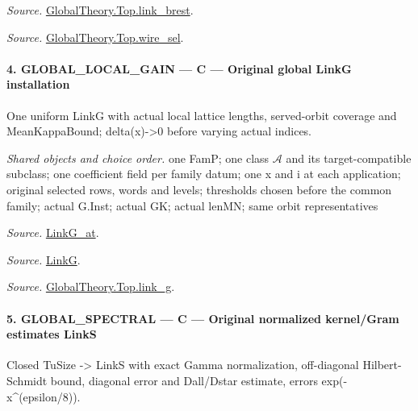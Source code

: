 \documentclass[11pt,a4paper]{article}
\numberwithin{equation}{section}
\theoremstyle{remark}\newtheorem{remark}[theorem]{Remark}
\begin{document}
\emph{Source.} \href{https://github.com/CocoSgt/riemann-hypothesis-lean/blob/7cbf7a0c32fca1badf05931879a37c3f8a2b03b4/src/Development/AbelianVarietyTheory/Proofs/GlobalInterpolation/LinkBrest.lean#L7-L25}{GlobalTheory.Top.link\_\allowbreak brest}.

\emph{Source.} \href{https://github.com/CocoSgt/riemann-hypothesis-lean/blob/7cbf7a0c32fca1badf05931879a37c3f8a2b03b4/src/Development/AbelianVarietyTheory/Proofs/GlobalInterpolation/WireSel.lean#L11-L41}{GlobalTheory.Top.wire\_\allowbreak sel}.



\paragraph{4. GLOBAL\_\allowbreak LOCAL\_\allowbreak GAIN — C — Original global LinkG installation}

One uniform LinkG with actual local lattice lengths, served-orbit coverage and MeanKappaBound; delta(x)->0 before varying actual indices.

\emph{Shared objects and choice order.} one FamP; one class $\mathcal A$ and its target-compatible subclass; one coefficient field per family datum; one x and i at each application; original selected rows, words and levels; thresholds chosen before the common family; actual G.Inst; actual GK; actual lenMN; same orbit representatives

\emph{Source.} \href{https://github.com/CocoSgt/riemann-hypothesis-lean/blob/7cbf7a0c32fca1badf05931879a37c3f8a2b03b4/src/Formalism/SharpRestriction/GlobalTheoremInputs.lean#L122-L137}{LinkG\_\allowbreak at}.

\emph{Source.} \href{https://github.com/CocoSgt/riemann-hypothesis-lean/blob/7cbf7a0c32fca1badf05931879a37c3f8a2b03b4/src/Formalism/SharpRestriction/GlobalTheoremInputs.lean#L138-L141}{LinkG}.

\emph{Source.} \href{https://github.com/CocoSgt/riemann-hypothesis-lean/blob/7cbf7a0c32fca1badf05931879a37c3f8a2b03b4/src/Development/AbelianVarietyTheory/Proofs/GlobalInterpolation/LinkG.lean#L14-L27}{GlobalTheory.Top.link\_\allowbreak g}.



\paragraph{5. GLOBAL\_\allowbreak SPECTRAL — C — Original normalized kernel/Gram estimates LinkS}

Closed TuSize -> LinkS with exact Gamma normalization, off-diagonal Hilbert-Schmidt bound, diagonal error and Dall/Dstar estimate, errors exp(-x\textasciicircum{}(epsilon/8)).
\end{document}

